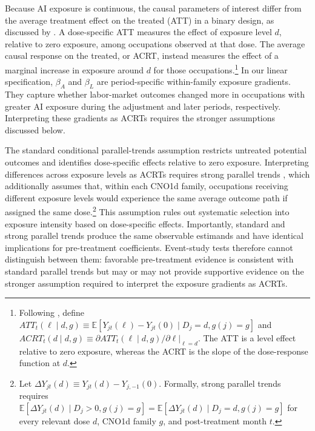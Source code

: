 Because AI exposure is continuous, the causal parameters of interest differ from the average treatment effect on the treated (ATT) in a binary design, as discussed by \citet{callaway_goodmanbacon_santanna_2024}. A dose-specific ATT measures the effect of exposure level \(d\), relative to zero exposure, among occupations observed at that dose. The average causal response on the treated, or ACRT, instead measures the effect of a marginal increase in exposure around \(d\) for those occupations.\footnote{Following \citet{callaway_goodmanbacon_santanna_2024}, define \(ATT_t(\ell\mid d,g)\equiv\mathbb{E}[Y_{jt}(\ell)-Y_{jt}(0)\mid D_j=d,g(j)=g]\) and \(ACRT_t(d\mid d,g)\equiv\left.\partial ATT_t(\ell\mid d,g)/\partial\ell\right|_{\ell=d}\). The ATT is a level effect relative to zero exposure, whereas the ACRT is the slope of the dose-response function at \(d\).} In our linear specification, \(\beta_A\) and \(\beta_L\) are period-specific within-family exposure gradients. They capture whether labor-market outcomes changed more in occupations with greater AI exposure during the adjustment and later periods, respectively. Interpreting these gradients as ACRTs requires the stronger assumptions discussed below.

The standard conditional parallel-trends assumption restricts untreated potential outcomes and identifies dose-specific effects relative to zero exposure. Interpreting differences across exposure levels as ACRTs requires strong parallel trends \citep{callaway_goodmanbacon_santanna_2024}, which additionally assumes that, within each CNO1d family, occupations receiving different exposure levels would experience the same average outcome path if assigned the same dose.\footnote{Let \(\Delta Y_{jt}(d)\equiv Y_{jt}(d)-Y_{j,-1}(0)\). Formally, strong parallel trends requires \(\mathbb{E}[\Delta Y_{jt}(d)\mid D_j>0,g(j)=g]=\mathbb{E}[\Delta Y_{jt}(d)\mid D_j=d,g(j)=g]\) for every relevant dose \(d\), CNO1d family \(g\), and post-treatment month \(t\).} This assumption rules out systematic selection into exposure intensity based on dose-specific effects. Importantly, standard and strong parallel trends produce the same observable estimands and have identical implications for pre-treatment coefficients. Event-study tests therefore cannot distinguish between them: favorable pre-treatment evidence is consistent with standard parallel trends but may or may not provide supportive evidence on the stronger assumption required to interpret the exposure gradients as ACRTs.

